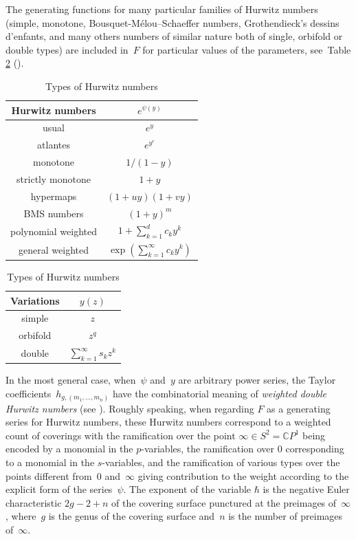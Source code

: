 \documentclass[JEP,XML,SOM,Unicode,NoEqCountersInSection,NoFloatCountersInSection]{cedram}
\newcommand{\C}{\mathbb{C}}
\theoremstyle{plain}
\theoremstyle{definition}
\theoremstyle{remark}
\begin{document}
The generating functions for many particular families of Hurwitz numbers (\eg simple, monotone, Bousquet-Mélou--Schaeffer numbers, Grothendieck's dessins d'enfants, and many others numbers of similar nature both of single, orbifold or double types) are included in~$F$ for particular values of the parameters, see~Table \ref{tab:Hurw} (\cf \cite{ACEH-1,ALS,Harnad2014,KazLand}).
\begin{table}[htb]
\caption{Types of Hurwitz numbers}\label{tab:Hurw}
\renewcommand{\arraystretch}{1.3}
\begin{tabular}{|c|c|}
\hline
Hurwitz numbers & $e^{\psi(y)}$\\
\hline
\hline
usual & $e^{y}$ \\
atlantes
& $e^{y^r}$ \\
monotone & $1/(1-y)$ \\
strictly monotone & $1+y$ \\
hypermaps & $(1+uy)(1+vy)$\\
BMS numbers & $(1+y)^m$ \\
polynomial weighted& $1+\sum_{k=1}^d c_k y^k$\\
\hline
general weighted & $\exp\left({\sum_{k=1}^\infty c_k y^k}\right)$\\
\hline
\end{tabular} \quad \begin{tabular}{|c|c|}
\hline
Variations & $y(z)$\\
\hline
\hline
simple & $z$ \\
orbifold & $z^q$ \\
\hline
double & $\sum_{k=1}^\infty s_kz^k$ \\
\hline
\end{tabular}
\end{table}

In the most general case, when~$\psi$ and~$y$ are arbitrary power series, the Taylor coefficients~$h_{g,(m_1,\dots,m_n)}$ have the combinatorial meaning of \emph{weighted double Hurwitz numbers} (see \eg \cite{Harnad2014}).
Roughly speaking, when regarding $F$ as a generating series for Hurwitz numbers, these Hurwitz numbers correspond to a weighted count of coverings with the ramification over the point $\infty\in S^2=\C P^1$ being encoded by a monomial in the $p$-variables, the ramification over $0$ corresponding to a monomial in the $s$\nobreakdash-variables, and the ramification of various types over the points different from~$0$ and~$\infty$ giving contribution to the weight according to the explicit form of the series~$\psi$. The exponent of the variable $\hbar$ is the negative Euler characteristic $2g-2+n$ of the covering surface punctured at the preimages of~$\infty$, where~$g$ is the genus of the covering surface and~$n$ is the number of preimages of~$\infty$.
\end{document}
